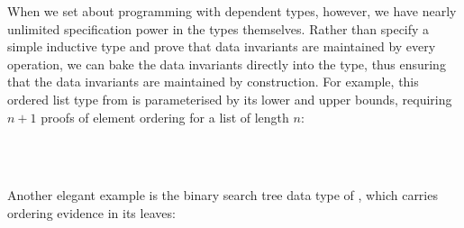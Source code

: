 \documentclass[sigplan]{acmart}%
\begin{document}
When we set about programming with dependent types, however, we have nearly unlimited 
specification power in the types themselves. Rather than 
specify a simple inductive type and prove that data invariants are maintained
by every operation, we can bake the data invariants directly into the type, thus 
ensuring that the data invariants are maintained by construction.
For example, this ordered list type from \citet{hasochism}
is parameterised by its lower and upper bounds,
requiring $n + 1$ proofs of element ordering for a list of length $n$:
\begin{code}
\>[2]\AgdaSpace{}%
\AgdaSpace{}%
\AgdaSymbol{(}\AgdaSpace{}%
\AgdaSpace{}%
\AgdaSymbol{:}\AgdaSpace{}%
\AgdaSymbol{)}\AgdaSpace{}%
\AgdaSymbol{:}\AgdaSpace{}%
\AgdaSpace{}%
\<%
\\
\>[2][@{}l@{\AgdaIndent{0}}]%
\>[4]%
\>[9]\AgdaSymbol{:}\AgdaSpace{}%
\AgdaSymbol{(}\AgdaSpace{}%
\AgdaSpace{}%
\AgdaSymbol{)}\AgdaSpace{}%
\AgdaSpace{}%
\AgdaSpace{}%
\AgdaSpace{}%
\<%
\\
%
\>[4]\AgdaSpace{}%
\AgdaSymbol{:}\AgdaSpace{}%
\AgdaSymbol{(}\AgdaSpace{}%
\AgdaSymbol{:}\AgdaSpace{}%
\AgdaSymbol{)}\AgdaSpace{}%
\AgdaSpace{}%
\AgdaSymbol{(}\AgdaSpace{}%
\AgdaSpace{}%
\AgdaSymbol{)}\AgdaSpace{}%
\AgdaSpace{}%
\AgdaSpace{}%
\AgdaSpace{}%
\AgdaSpace{}%
\AgdaSpace{}%
\AgdaSpace{}%
\AgdaSpace{}%
\<%
%
\end{code}
Another elegant example is the binary search tree data type 
of \citet{neighbors}, which 
carries ordering evidence in its leaves:
\end{document}
